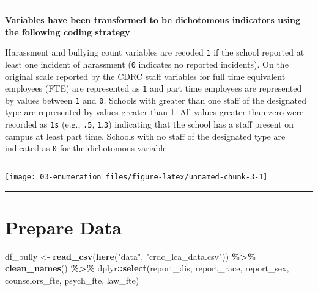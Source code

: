 \documentclass[
]{book}
\newenvironment{Shaded}{\begin{snugshade}}{\end{snugshade}}
\newcommand{\FunctionTok}[1]{\textcolor[rgb]{0.13,0.29,0.53}{\textbf{#1}}}
\newcommand{\NormalTok}[1]{#1}
\newcommand{\OtherTok}[1]{\textcolor[rgb]{0.56,0.35,0.01}{#1}}
\newcommand{\SpecialCharTok}[1]{\textcolor[rgb]{0.81,0.36,0.00}{\textbf{#1}}}
\newcommand{\StringTok}[1]{\textcolor[rgb]{0.31,0.60,0.02}{#1}}
\begin{document}
\begin{center}\rule{0.5\linewidth}{0.5pt}\end{center}

\textbf{Variables have been transformed to be dichotomous indicators using the following coding strategy}

Harassment and bullying count variables are recoded \texttt{1} if the school reported at least one incident of harassment (\texttt{0} indicates no reported incidents).
On the original scale reported by the CDRC staff variables for full time equivalent employees (FTE) are represented as \texttt{1} and part time employees are represented by values between \texttt{1} and \texttt{0}.
Schools with greater than one staff of the designated type are represented by values greater than 1.
All values greater than zero were recorded as \texttt{1s} (e.g., \texttt{.5}, \texttt{1},\texttt{3}) indicating that the school has a staff present on campus at least part time.
Schools with no staff of the designated type are indicated as \texttt{0} for the dichotomous variable.

\begin{center}\rule{0.5\linewidth}{0.5pt}\end{center}

\begin{center}\texttt{[image: 03-enumeration\_files/figure-latex/unnamed-chunk-3-1]} \end{center}

\begin{center}\rule{0.5\linewidth}{0.5pt}\end{center}

\section{Prepare Data}\label{prepare-data}

\begin{Shaded}
\begin{Highlighting}[]
\NormalTok{df\_bully }\OtherTok{\textless{}{-}} \FunctionTok{read\_csv}\NormalTok{(}\FunctionTok{here}\NormalTok{(}\StringTok{"data"}\NormalTok{, }\StringTok{"crdc\_lca\_data.csv"}\NormalTok{)) }\SpecialCharTok{\%\textgreater{}\%} 
  \FunctionTok{clean\_names}\NormalTok{() }\SpecialCharTok{\%\textgreater{}\%} 
\NormalTok{  dplyr}\SpecialCharTok{::}\FunctionTok{select}\NormalTok{(report\_dis, report\_race, report\_sex, counselors\_fte, psych\_fte, law\_fte) }
\end{Highlighting}
\end{Shaded}
\end{document}
